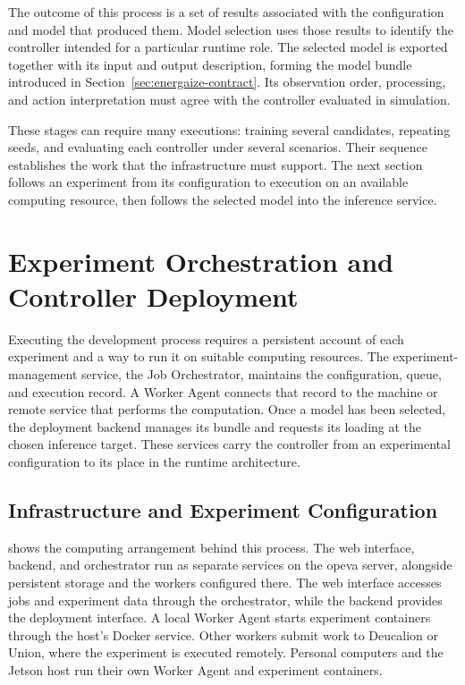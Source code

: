 The outcome of this process is a set of results associated with the configuration and model that produced them. Model selection uses those results to identify the controller intended for a particular runtime role. The selected model is exported together with its input and output description, forming the model bundle introduced in Section~\ref{sec:energaize-contract}. Its observation order, processing, and action interpretation must agree with the controller evaluated in simulation.

These stages can require many executions: training several candidates, repeating seeds, and evaluating each controller under several scenarios. Their sequence establishes the work that the infrastructure must support. The next section follows an experiment from its configuration to execution on an available computing resource, then follows the selected model into the inference service.

\section{Experiment Orchestration and Controller Deployment}
\label{sec:orchestration}
\label{sec:energaize-deployment}
\label{sec:lifecycle-governance}

Executing the development process requires a persistent account of each experiment and a way to run it on suitable computing resources. The experiment-management service, the Job Orchestrator, maintains the configuration, queue, and execution record. A Worker Agent connects that record to the machine or remote service that performs the computation. Once a model has been selected, the deployment backend manages its bundle and requests its loading at the chosen inference target. These services carry the controller from an experimental configuration to its place in the runtime architecture.

\subsection{Infrastructure and Experiment Configuration}
\label{sec:energaize-infrastructure}
\label{sec:lifecycle-core}
\label{sec:lifecycle-entities}

 shows the computing arrangement behind this process. The web interface, backend, and orchestrator run as separate services on the \gls{opeva} server, alongside persistent storage and the workers configured there. The web interface accesses jobs and experiment data through the orchestrator, while the backend provides the deployment interface. A local Worker Agent starts experiment containers through the host's Docker service. Other workers submit work to Deucalion or Union, where the experiment is executed remotely. Personal computers and the Jetson host run their own Worker Agent and experiment containers.

